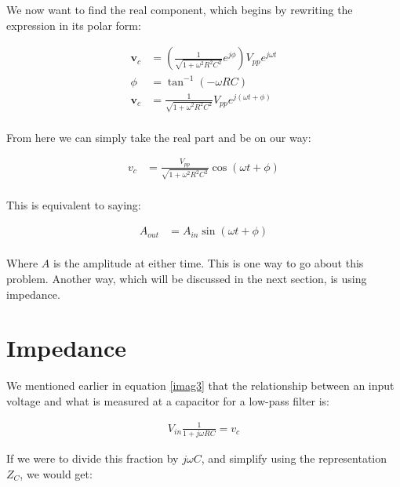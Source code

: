 \documentclass[12pt]{report}
\newcommand{\pr}[1]{\left(#1\right)}
\newcommand{\Vpp}{{ V}_{ pp}}
\newcommand{\Vi}{{V}_{in}}
\begin{document}
We now want to find the real component, which begins by rewriting the expression in its polar form: 

\begin{equation} \label{imag4}
\begin{split}
\textbf{v}_c &= \pr{\frac{1}{\sqrt{1 + \omega^2 R^2C^2}}e^{j\phi}}\Vpp e^{j\omega t} \\
\phi &= \tan^{-1}(-\omega RC) \\
\textbf{v}_c &= \frac{1}{\sqrt{1 + \omega^2 R^2C^2}}\Vpp e^{j(\omega t + \phi)} \\
\end{split}
\end{equation}

From here we can simply take the real part and be on our way:

\begin{equation} \label{imag5}
\begin{split}
v_c &= \frac{\Vpp}{\sqrt{1 + \omega^2 R^2C^2}} \cos(\omega t + \phi) \\
\end{split}
\end{equation}

This is equivalent to saying:

\begin{equation} \label{imag5}
\begin{split}
A_{out} &= A_{in}\sin(\omega t + \phi) \\
\end{split}
\end{equation}

Where $A$ is the amplitude at either time. This is one way to go about this problem. Another way, which will be discussed in the next section, is using impedance. 

\section{Impedance}
We mentioned earlier in equation \eqref{imag3} that the relationship between an input voltage and what is measured at a capacitor for a low-pass filter is: 

\begin{equation} \label{imp1}
\begin{split}
\Vi \frac{1}{1+j\omega RC} = v_c
\end{split}
\end{equation}

If we were to divide this fraction by $j\omega C$, and simplify using the representation $Z_C$, we would get: 
\end{document}

